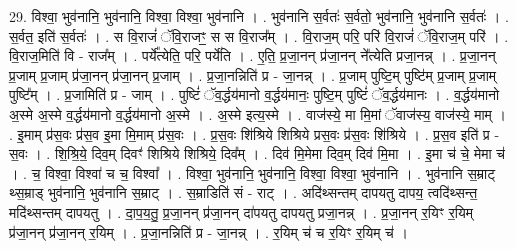 \documentclass[17pt]{extarticle}
\begin{document}
29. विश्वा॒ भुव॑नानि॒ भुव॑नानि॒ विश्वा॒ विश्वा॒ भुव॑नानि । . भुव॑नानि स॒र्वतः॑ स॒र्वतो॒ भुव॑नानि॒ भुव॑नानि स॒र्वतः॑ । . स॒र्वत॒ इति॑ स॒र्वतः॑ । . स वि॒राजं॑ ॅवि॒राजꣳ॒॒ स स वि॒राज᳚म् । . वि॒राज॒म् परि॒ परि॑ वि॒राजं॑ ॅवि॒राज॒म् परि॑ । . वि॒राज॒मिति॑ वि - राज᳚म् । . पर्ये᳚त्येति॒ परि॒ पर्ये॑ति । . ए॒ति॒ प्र॒जा॒नन् प्र॑जा॒नन् ने᳚त्येति प्रजा॒नन्न् । . प्र॒जा॒नन् प्र॒जाम् प्र॒जाम् प्र॑जा॒नन् प्र॑जा॒नन् प्र॒जाम् । . प्र॒जा॒नन्निति॑ प्र - जा॒नन्न् । . प्र॒जाम् पुष्टि॒म् पुष्टि॑म् प्र॒जाम् प्र॒जाम् पुष्टि᳚म् । . प्र॒जामिति॑ प्र - जाम् । . पुष्टिं॑ ॅव॒र्द्धय॑मानो व॒र्द्धय॑मानः॒ पुष्टि॒म् पुष्टिं॑ ॅव॒र्द्धय॑मानः । . व॒र्द्धय॑मानो अ॒स्मे अ॒स्मे व॒र्द्धय॑मानो व॒र्द्धय॑मानो अ॒स्मे । . अ॒स्मे इत्य॒स्मे । . वाज॑स्ये॒ मा मि॒मां ॅवाज॑स्य॒ वाज॑स्ये॒ माम् । . इ॒माम् प्र॑स॒वः प्र॑स॒व इ॒मा मि॒माम् प्र॑स॒वः । . प्र॒स॒वः शि॑श्रिये शिश्रिये प्रस॒वः प्र॑स॒वः शि॑श्रिये । . प्र॒स॒व इति॑ प्र - स॒वः । . शि॒श्रि॒ये॒ दिव॒म् दिवꣳ॑ शिश्रिये शिश्रिये॒ दिव᳚म् । . दिव॑ मि॒मेमा दिव॒म् दिव॑ मि॒मा । . इ॒मा च॑ चे॒ मेमा च॑ । . च॒ विश्वा॒ विश्वा॑ च च॒ विश्वा᳚ । . विश्वा॒ भुव॑नानि॒ भुव॑नानि॒ विश्वा॒ विश्वा॒ भुव॑नानि । . भुव॑नानि स॒म्राट् थ्स॒म्राड् भुव॑नानि॒ भुव॑नानि स॒म्राट् । . स॒म्राडिति॑ सं - राट् । . अदि॑थ्सन्तम् दापयतु दापय॒ त्वदि॑थ्सन्त॒ मदि॑थ्सन्तम् दापयतु । . दा॒प॒य॒तु॒ प्र॒जा॒नन् प्र॑जा॒नन् दा॑पयतु दापयतु प्रजा॒नन्न् । . प्र॒जा॒नन् र॒यिꣳ र॒यिम् प्र॑जा॒नन् प्र॑जा॒नन् र॒यिम् । . प्र॒जा॒नन्निति॑ प्र - जा॒नन्न् । . र॒यिम् च॑ च र॒यिꣳ र॒यिम् च॑ । \newline
\end{document}
